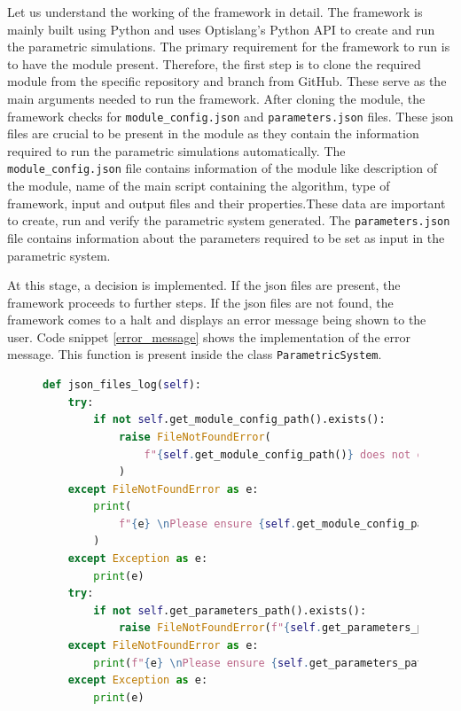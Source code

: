Let us understand the working of the framework in detail. The framework is mainly built using Python and uses Optislang's Python API to create and run the 
parametric simulations. The primary requirement for the framework to run is to have the module present. Therefore, the first step is to clone the required module
from the specific repository and branch from GitHub. These serve as the main arguments needed to run the framework. After cloning the module, the framework checks for 
\texttt{module\_config.json} and \texttt{parameters.json} files. These \acrshort{json} files are crucial to be present in the module as they contain the 
information required to run the parametric simulations automatically. The \texttt{module\_config.json} file contains information of 
the module like description of the module, name of the main script containing the algorithm, type of framework, input and output files and their properties.These data are important 
to create, run and verify the parametric system generated. The \texttt{parameters.json} file contains information about the parameters required to be set as input 
in the parametric system.

At this stage, a decision is implemented. If the \acrshort{json} files are present, the framework proceeds to further steps. If the \acrshort{json} files are not found, the framework
comes to a halt and displays an error message being shown to the user. Code snippet \ref{error_message} shows the implementation of the error message. This function is present
inside the class \texttt{ParametricSystem}.
\begin{figure}[!ht]
    \centering
    \renewcommand{\lstlistingname}{Code}
    \lstset{style=pythoncode}
    \begin{lstlisting}[language=python, caption= Function to verify existance of \acrshort{json} files, label={error_message}]
def json_files_log(self):
    try:
        if not self.get_module_config_path().exists():
            raise FileNotFoundError(
                f"{self.get_module_config_path()} does not exist"
            )
    except FileNotFoundError as e:
        print(
            f"{e} \nPlease ensure {self.get_module_config_path()} exists and re-run"
        )
    except Exception as e:
        print(e)
    try:
        if not self.get_parameters_path().exists():
            raise FileNotFoundError(f"{self.get_parameters_path()} does not exist")
    except FileNotFoundError as e:
        print(f"{e} \nPlease ensure {self.get_parameters_path} exists and re-run")
    except Exception as e:
        print(e)
\end{lstlisting}
\end{figure}

